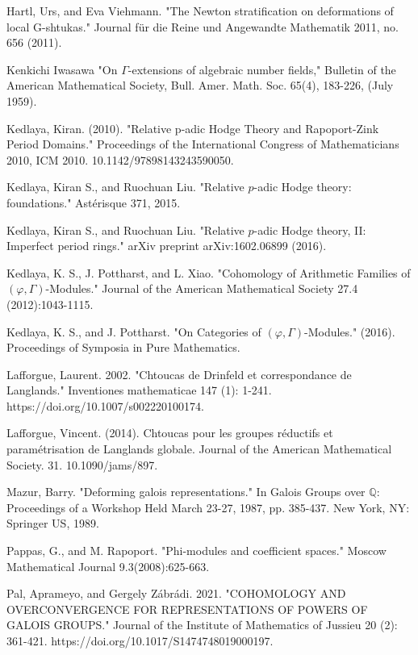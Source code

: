 \documentclass[12pt]{article}
\begin{document}
\begin{thebibliography}{}
 Hartl, Urs, and Eva Viehmann. "The Newton stratification on deformations of local G-shtukas." Journal f\"ur die Reine und Angewandte Mathematik 2011, no. 656 (2011).

 Kenkichi Iwasawa "On  $\Gamma$-extensions of algebraic number fields," Bulletin of the American Mathematical Society, Bull. Amer. Math. Soc. 65(4), 183-226, (July 1959).

 Kedlaya, Kiran. (2010). "Relative p-adic Hodge Theory and Rapoport-Zink Period Domains." Proceedings of the International Congress of Mathematicians 2010, ICM 2010. 10.1142/97898143243590050.

 Kedlaya, Kiran S., and Ruochuan Liu. "Relative $p$-adic Hodge theory: foundations." Ast\'erisque 371, 2015.

 Kedlaya, Kiran S., and Ruochuan Liu. "Relative $p$-adic Hodge theory, II: Imperfect period rings." arXiv preprint arXiv:1602.06899 (2016).

 Kedlaya, K. S.,  J. Pottharst, and  L. Xiao. "Cohomology of Arithmetic Families of $(\varphi,\Gamma)$-Modules." Journal of the American Mathematical Society 27.4 (2012):1043-1115.

 Kedlaya, K. S., and  J. Pottharst. "On Categories of $(\varphi, \Gamma)$-Modules." (2016). Proceedings of Symposia in Pure Mathematics.

  Lafforgue, Laurent. 2002. "Chtoucas de Drinfeld et correspondance de Langlands." Inventiones mathematicae 147 (1): 1-241. https://doi.org/10.1007/s002220100174.

 Lafforgue, Vincent. (2014). Chtoucas pour les groupes r\'eductifs et param\'etrisation de Langlands globale. Journal of the American Mathematical Society. 31. 10.1090/jams/897. 

 Mazur, Barry. "Deforming galois representations." In Galois Groups over $\mathbb{Q}$: Proceedings of a Workshop Held March 23-27, 1987, pp. 385-437. New York, NY: Springer US, 1989.

  Pappas, G., and  M. Rapoport. "Phi-modules and coefficient spaces." Moscow Mathematical Journal 9.3(2008):625-663.

 Pal, Aprameyo, and Gergely Z\'abr\'adi. 2021. "COHOMOLOGY AND OVERCONVERGENCE FOR REPRESENTATIONS OF POWERS OF GALOIS GROUPS." Journal of the Institute of Mathematics of Jussieu 20 (2): 361-421. https://doi.org/10.1017/S1474748019000197.


\end{thebibliography}
\end{document}
